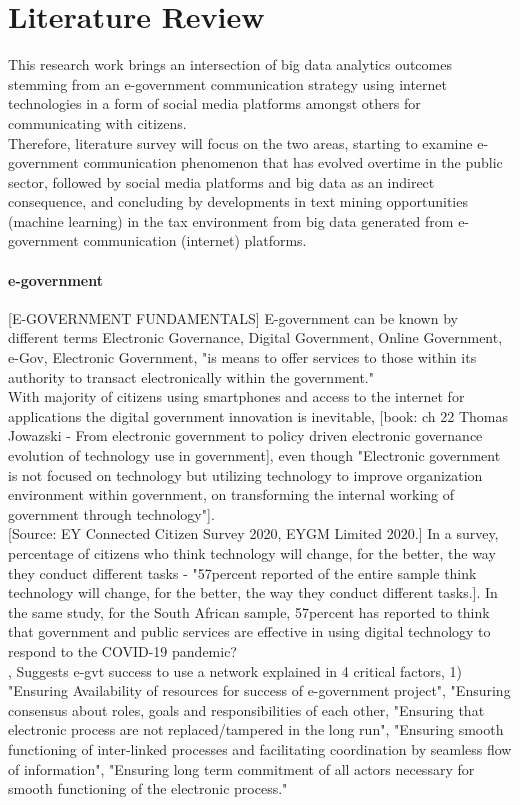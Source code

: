 
\chapter{Literature Review}
\label{chap:lit_review}

This research work brings an intersection of big data analytics outcomes stemming from an e-government communication strategy using internet technologies in a form of social media platforms amongst others for communicating with citizens.  \\
Therefore, literature survey will focus on the two areas, starting to examine e-government communication phenomenon that has evolved overtime in the public sector, followed by social media platforms and big data as an indirect consequence, and concluding by developments in text mining opportunities (machine learning) in the tax environment from big data generated from e-government communication (internet) platforms.  

\subsubsection{e-government}
[E-GOVERNMENT FUNDAMENTALS] E-government can be known by different terms Electronic Governance, Digital Government, Online Government, e-Gov, Electronic Government, "is means to offer services to those within its authority to transact electronically within the government."\\
With majority of citizens using smartphones and access to the internet for applications the digital government innovation is inevitable, [book: ch 22 Thomas Jowazski - From electronic government to policy driven electronic governance evolution of technology use in government], even though "Electronic government is not focused on technology but utilizing technology to improve organization environment within government, on transforming the internal working of government through technology"].\\

[Source: EY Connected Citizen Survey 2020, EYGM Limited 2020.]  In a survey, percentage of citizens who think technology will change, for the better, the way they conduct different tasks - "57percent reported of the entire sample think technology will change, for the better, the way they conduct different tasks.].  In the same study, for the South African sample, 57percent has reported to think that  government and public services are effective in using digital technology to respond to the COVID-19 pandemic?\\
[Making e-gvt work: Adopting the network approach Government Information Quarterly 31 (2014) 327-336], Suggests e-gvt success to use a network explained in 4 critical factors, 1) "Ensuring Availability of resources for success of e-government project", "Ensuring consensus about roles, goals and responsibilities of each other, "Ensuring that electronic process are not replaced/tampered in the long run", "Ensuring smooth functioning of inter-linked processes and facilitating coordination by seamless flow of information", "Ensuring long term commitment of all actors necessary for smooth functioning of the electronic process."\\

